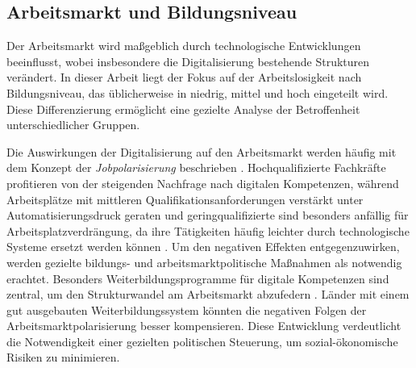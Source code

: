

\subsection{Arbeitsmarkt und Bildungsniveau}

Der Arbeitsmarkt wird maßgeblich durch technologische Entwicklungen beeinflusst,
wobei insbesondere die Digitalisierung bestehende Strukturen verändert. In dieser
Arbeit liegt der Fokus auf der Arbeitslosigkeit nach Bildungsniveau, das üblicherweise
in niedrig, mittel und hoch eingeteilt wird. Diese Differenzierung ermöglicht eine 
gezielte Analyse der Betroffenheit unterschiedlicher Gruppen.

Die Auswirkungen der Digitalisierung auf den Arbeitsmarkt werden häufig mit dem
Konzept der \textit{Jobpolarisierung} beschrieben 
\parencite[vgl.][S. 12]{autor2015whyare}. Hochqualifizierte Fachkräfte profitieren von 
der steigenden Nachfrage nach digitalen Kompetenzen, während Arbeitsplätze mit 
mittleren Qualifikationsanforderungen verstärkt unter Automatisierungsdruck geraten und 
geringqualifizierte sind besonders anfällig 
für Arbeitsplatzverdrängung, da ihre Tätigkeiten häufig leichter durch technologische 
Systeme ersetzt werden können \parencite[vgl.][S. 10]{acemoglu2002technical}.
Um den negativen Effekten entgegenzuwirken, werden gezielte bildungs- und
arbeitsmarktpolitische Maßnahmen als notwendig erachtet. Besonders
Weiterbildungsprogramme für digitale Kompetenzen sind zentral, um den
Strukturwandel am Arbeitsmarkt abzufedern 
\parencite[vgl.][Kap. 13]{brynjolfsson2014thesecond}. Länder mit einem gut ausgebauten 
Weiterbildungssystem könnten die negativen Folgen der Arbeitsmarktpolarisierung besser 
kompensieren. Diese Entwicklung verdeutlicht die Notwendigkeit einer gezielten 
politischen Steuerung, um sozial-ökonomische Risiken zu minimieren.
